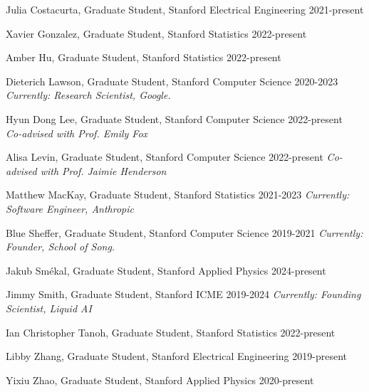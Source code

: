 \documentclass[10pt]{article}
\renewcommand{\section}[1]{\pagebreak[3]%
    \hyphenpenalty=10000%
    \vspace{1.3\baselineskip}%
    \noindent\llap{\scshape\smash{\parbox[t]{\marginparwidth}{\raggedright #1}}}%
    \vspace{-\baselineskip}\par}
\newcommand{\blankline}{\quad\pagebreak[3]}
\begin{document}
\blankline


\section{Student\\Advising}

\begin{outerlist}
  
\item Julia Costacurta, Graduate Student, Stanford Electrical Engineering \hfill {\small 2021-present}
  
\item Xavier Gonzalez, Graduate Student, Stanford Statistics \hfill {\small 2022-present}

\item Amber Hu, Graduate Student, Stanford Statistics \hfill {\small 2022-present}

\item Dieterich Lawson, Graduate Student, Stanford Computer Science \hfill {\small 2020-2023} \\
  \textit{Currently: Research Scientist, Google.}
  
\item Hyun Dong Lee, Graduate Student, Stanford Computer Science \hfill {\small 2022-present} \\
  \textit{Co-advised with Prof. Emily Fox}
  
\item Alisa Levin, Graduate Student, Stanford Computer Science \hfill {\small 2022-present}
  \textit{Co-advised with Prof. Jaimie Henderson}

\item Matthew MacKay, Graduate Student, Stanford Statistics \hfill {\small 2021-2023}
  \textit{Currently: Software Engineer, Anthropic}
  
\item Blue Sheffer, Graduate Student, Stanford Computer Science \hfill {\small 2019-2021}
  \textit{Currently: Founder, School of Song.}

\item Jakub Sm\'{e}kal, Graduate Student, Stanford Applied Physics \hfill {\small 2024-present}
  
\item Jimmy Smith, Graduate Student, Stanford ICME \hfill {\small 2019-2024}
  \textit{Currently: Founding Scientist, Liquid AI}
  
\item Ian Christopher Tanoh, Graduate Student, Stanford Statistics  \hfill {\small 2022-present}

\item Libby Zhang, Graduate Student, Stanford Electrical Engineering \hfill {\small 2019-present}

\item Yixiu Zhao, Graduate Student, Stanford Applied Physics \hfill {\small 2020-present}


\end{outerlist}
\end{document}
